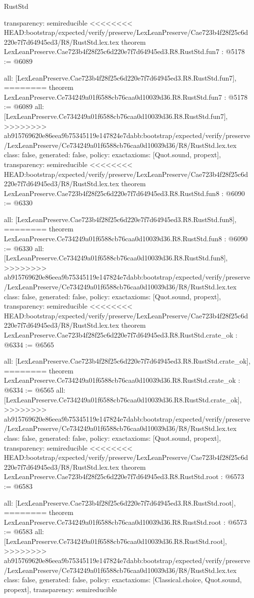 \begin{lexlean}{RustStd}
\begin{coremodule}
{\begin{coremodule}
{{{{{{{{{{  transparency: semireducible
}
<<<<<<<< HEAD:bootstrap/expected/verify/preserve/LexLeanPreserve/Cae723b4f28f25c6d220e7f7d64945ed3/R8/RustStd.lex.tex
theorem LexLeanPreserve.Cae723b4f28f25c6d220e7f7d64945ed3.R8.RustStd.fun7 : @5178 := @6089 {
  all: [LexLeanPreserve.Cae723b4f28f25c6d220e7f7d64945ed3.R8.RustStd.fun7],
========
theorem LexLeanPreserve.Ce734249a01f6588cb76caa0d10039d36.R8.RustStd.fun7 : @5178 := @6089 {
  all: [LexLeanPreserve.Ce734249a01f6588cb76caa0d10039d36.R8.RustStd.fun7],
>>>>>>>> ab915769620e86eea9b75345119e147824e7dabb:bootstrap/expected/verify/preserve/LexLeanPreserve/Ce734249a01f6588cb76caa0d10039d36/R8/RustStd.lex.tex
  class: false,
  generated: false,
  policy: exact{axioms: [Quot.sound, propext]},
  transparency: semireducible
}
<<<<<<<< HEAD:bootstrap/expected/verify/preserve/LexLeanPreserve/Cae723b4f28f25c6d220e7f7d64945ed3/R8/RustStd.lex.tex
theorem LexLeanPreserve.Cae723b4f28f25c6d220e7f7d64945ed3.R8.RustStd.fun8 : @6090 := @6330 {
  all: [LexLeanPreserve.Cae723b4f28f25c6d220e7f7d64945ed3.R8.RustStd.fun8],
========
theorem LexLeanPreserve.Ce734249a01f6588cb76caa0d10039d36.R8.RustStd.fun8 : @6090 := @6330 {
  all: [LexLeanPreserve.Ce734249a01f6588cb76caa0d10039d36.R8.RustStd.fun8],
>>>>>>>> ab915769620e86eea9b75345119e147824e7dabb:bootstrap/expected/verify/preserve/LexLeanPreserve/Ce734249a01f6588cb76caa0d10039d36/R8/RustStd.lex.tex
  class: false,
  generated: false,
  policy: exact{axioms: [Quot.sound, propext]},
  transparency: semireducible
}
<<<<<<<< HEAD:bootstrap/expected/verify/preserve/LexLeanPreserve/Cae723b4f28f25c6d220e7f7d64945ed3/R8/RustStd.lex.tex
theorem LexLeanPreserve.Cae723b4f28f25c6d220e7f7d64945ed3.R8.RustStd.crate_ok : @6334 := @6565 {
  all: [LexLeanPreserve.Cae723b4f28f25c6d220e7f7d64945ed3.R8.RustStd.crate_ok],
========
theorem LexLeanPreserve.Ce734249a01f6588cb76caa0d10039d36.R8.RustStd.crate_ok : @6334 := @6565 {
  all: [LexLeanPreserve.Ce734249a01f6588cb76caa0d10039d36.R8.RustStd.crate_ok],
>>>>>>>> ab915769620e86eea9b75345119e147824e7dabb:bootstrap/expected/verify/preserve/LexLeanPreserve/Ce734249a01f6588cb76caa0d10039d36/R8/RustStd.lex.tex
  class: false,
  generated: false,
  policy: exact{axioms: [Quot.sound, propext]},
  transparency: semireducible
}
<<<<<<<< HEAD:bootstrap/expected/verify/preserve/LexLeanPreserve/Cae723b4f28f25c6d220e7f7d64945ed3/R8/RustStd.lex.tex
theorem LexLeanPreserve.Cae723b4f28f25c6d220e7f7d64945ed3.R8.RustStd.root : @6573 := @6583 {
  all: [LexLeanPreserve.Cae723b4f28f25c6d220e7f7d64945ed3.R8.RustStd.root],
========
theorem LexLeanPreserve.Ce734249a01f6588cb76caa0d10039d36.R8.RustStd.root : @6573 := @6583 {
  all: [LexLeanPreserve.Ce734249a01f6588cb76caa0d10039d36.R8.RustStd.root],
>>>>>>>> ab915769620e86eea9b75345119e147824e7dabb:bootstrap/expected/verify/preserve/LexLeanPreserve/Ce734249a01f6588cb76caa0d10039d36/R8/RustStd.lex.tex
  class: false,
  generated: false,
  policy: exact{axioms: [Classical.choice, Quot.sound, propext]},
  transparency: semireducible
}

}}}}}}}}}}}}}
\end{coremodule}}
\end{coremodule}
\end{lexlean}
